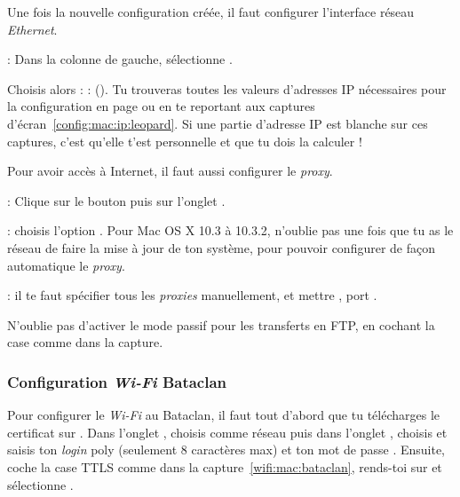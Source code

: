 Une fois la nouvelle configuration créée, il faut configurer l'interface réseau \emph{Ethernet}.



 : Dans la colonne de gauche, sélectionne .

Choisis alors  :%
 :  (). Tu trouveras toutes les valeurs d'adresses IP nécessaires pour la configuration en page \pageref{calcul_ip} ou en te reportant aux captures d'écran~\ref{config:mac:ip:leopard}. Si une partie d'adresse IP est blanche sur ces captures, c'est qu'elle t'est personnelle et que tu dois la calculer !


  
  



Pour avoir accès à Internet, il faut aussi configurer le \emph{proxy}.

 : Clique sur le bouton  puis sur l'onglet .


 :  choisis l'option . Pour Mac OS X 10.3 à 10.3.2, n'oublie pas une fois que tu as le réseau de faire la mise à jour de ton système, pour pouvoir configurer de façon automatique le \emph{proxy}.

 : il te faut spécifier tous les
\emph{proxies} manuellement, et mettre , port .


N'oublie pas d'activer le mode passif pour les transferts en FTP, en cochant la case comme dans la capture.



  
\subsubsection{Configuration \emph{Wi-Fi} Bataclan}
Pour configurer le \emph{Wi-Fi} au Bataclan, il faut tout d'abord que tu télécharges  le certificat sur .
Dans l'onglet , choisis comme réseau  puis dans l'onglet , choisis  et saisis ton \emph{login} poly (seulement 8 caractères max) et ton mot de passe . Ensuite, coche la case TTLS comme dans la capture~\ref{wifi:mac:bataclan}, rends-toi sur  et sélectionne .

